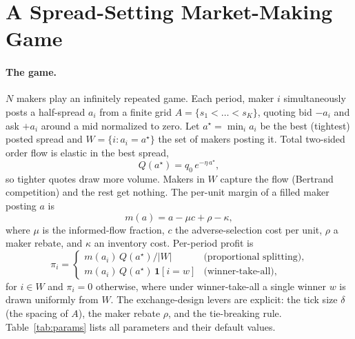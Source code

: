 \documentclass[sigconf]{acmart}
\begin{document}
\section{A Spread-Setting Market-Making Game}
\label{sec:model}

\paragraph{The game.} $N$ makers play an infinitely repeated game. Each period, maker $i$ simultaneously posts a half-spread $a_i$ from a finite grid $A = \{s_1 < \dots < s_K\}$, quoting bid $-a_i$ and ask $+a_i$ around a mid normalized to zero. Let $a^\star = \min_i a_i$ be the best (tightest) posted spread and $W = \{i : a_i = a^\star\}$ the set of makers posting it. Total two-sided order flow is elastic in the best spread,
\[
Q(a^\star) = q_0\, e^{-\eta\, a^\star},
\]
so tighter quotes draw more volume. Makers in $W$ capture the flow (Bertrand competition) and the rest get nothing. The per-unit margin of a filled maker posting $a$ is
\[
m(a) = a - \mu c + \rho - \kappa,
\]
where $\mu$ is the informed-flow fraction, $c$ the adverse-selection cost per unit, $\rho$ a maker rebate, and $\kappa$ an inventory cost. Per-period profit is
\[
\pi_i =
\begin{cases}
m(a_i)\, Q(a^\star)/|W| & \text{(proportional splitting)},\\
m(a_i)\, Q(a^\star)\,\mathbf{1}[i = w] & \text{(winner-take-all)},
\end{cases}
\]
for $i \in W$ and $\pi_i = 0$ otherwise, where under winner-take-all a single winner $w$ is drawn uniformly from $W$. The exchange-design levers are explicit: the tick size $\delta$ (the spacing of $A$), the maker rebate $\rho$, and the tie-breaking rule. Table~\ref{tab:params} lists all parameters and their default values.
\end{document}
